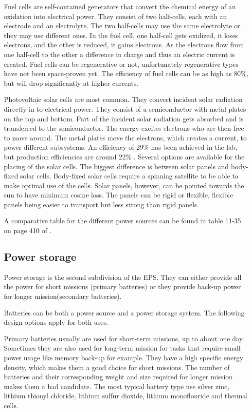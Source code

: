 Fuel cells are self-contained generators that convert the chemical energy of an oxidation into electrical power. They consist of two half-cells, each with an electrode and an electrolyte. The two half-cells may use the same electrolyte or they may use different ones.
In the fuel cell, one half-cell gets oxidized, it loses electrons, and the other is reduced, it gains electrons. As the electrons flow from
one half-cell to the other a difference in charge and thus an electric current is created. Fuel cells can be regenerative or not, unfortunately regenerative types have not been space-proven yet\cite{rees}.
The efficiency of fuel cells can be as high as 80\%, but will drop significantly at higher currents.

Photovoltaic solar cells are most common. They convert incident solar radiation directly in to electrical power. They consist of a semiconductor with metal plates on the top and bottom. Part of the incident solar radiation gets absorbed and is transferred to the
semiconductor. The energy excites electrons who are then free to move around. The metal plates move the electrons, which creates a current,
to power different subsystems. An efficiency of 29\% has been achieved \cite{doody1} in the lab, but production efficiencies are around 22\% \cite{larson}. Several options are available for the placing of the solar cells. The biggest difference is between solar panels and body-fixed solar cells. Body-fixed solar cells require a spinning satellite to be able to make optimal use of the cells. Solar panels, however, can be pointed towards the sun to have minimum cosine loss. The panels can be rigid or flexible, flexible panels being easier to transport but less strong than rigid panels.

A comparative table for the different power sources can be found in table 11-35 on page 410 of \cite{larson}.

\subsection{Power storage}
\label{blDOstorage}

Power storage is the second subdivision of the EPS. They can either provide all the power for short missions (primary batteries) or they provide back-up power for longer mission(secondary batteries).

Batteries can be both a power source and a power storage system. The following design options apply for both uses.

Primary batteries usually are used for short-term missions, up to about one day. Sometimes they are also used for long-term mission for tasks that require small power usage like memory back-up for example. They have a high specific energy density, which makes them a good choice for short missions. The number of batteries and their corresponding weight and size required for longer mission makes them a bad candidate. The most typical battery type use silver zinc, lithium thionyl chloride, lithium sulfur dioxide, lithium monoflouride and thermal cells.

